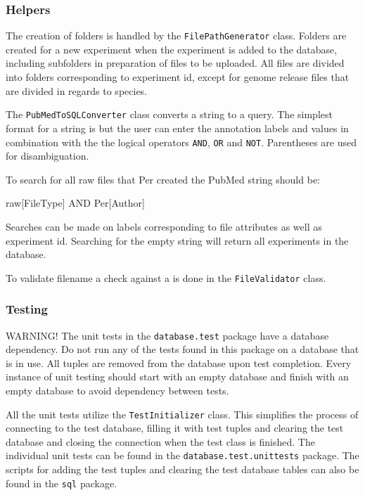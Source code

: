 \subsubsection{Helpers}
The creation of folders is handled by the \texttt{FilePathGenerator} class. Folders are created for a new experiment when the experiment is added to the database, including subfolders in preparation of files to be uploaded. All files are divided into folders corresponding to experiment id, except for genome release files that are divided in regards to species.

The \texttt{PubMedToSQLConverter} class converts a  string to a  query. The simplest format for a  string is  but the user can enter the annotation labels and values in combination with the the logical operators \texttt{AND}, \texttt{OR} and \texttt{NOT}. Parentheses are used for disambiguation.
\begin{example}
To search for all raw files that Per created the PubMed string should be:

raw[FileType] AND Per[Author]
\end{example}

Searches can be made on labels corresponding to file attributes as well as experiment id. Searching for the empty string will return all experiments in the database.

To validate filename a check against a  is done in the \texttt{FileValidator} class.

\subsubsection{Testing}
WARNING! The unit tests in the \texttt{database.test} package have a database dependency. Do not run any of the tests found in this package on a database that is in use. All tuples are removed from the database upon test completion. Every instance of unit testing should start with an empty database and finish with an empty database to avoid dependency between tests.

All the unit tests utilize the \texttt{TestInitializer} class. This simplifies the process of connecting to the test database, filling it with test tuples and clearing the test database and closing the connection when the test class is finished. The individual unit tests can be found in the \texttt{database.test.unittests} package. The scripts for adding the test tuples and clearing the test database tables can also be found in the \texttt{sql} package.